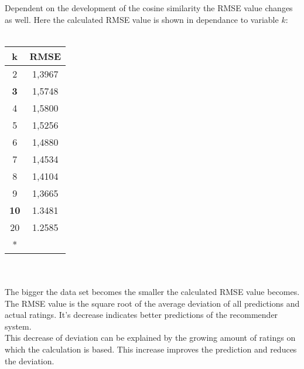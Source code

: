 \documentclass[a4paper,12pt,twoside]{article}
\begin{document}
Dependent on the development of the cosine similarity the RMSE value changes as well. Here the calculated RMSE value is shown in dependance to variable $k$:\\
\\
\begin{tabular}{c|c}
\textbf{k} & \textbf{RMSE} \\ \hline
	2 &  1,3967\\
	\textbf{3} & 1,5748 \\
	4 & 1,5800\\
	5 &  1,5256 \\
	6 &  1,4880\\
	7 & 1,4534\\
	8 &  1,4104  \\
	9 &  1,3665\\
	\textbf{10} & 1.3481 \\
	20 &  1.2585\\
	* & \\
\end{tabular} \\
\\
The bigger the data set becomes the smaller the calculated RMSE value becomes. The RMSE value is the square root of the average deviation of all predictions and actual ratings. It's decrease indicates better predictions of the recommender system.\\
This decrease of deviation can be explained by the growing amount of ratings on which the calculation is based. This increase improves the prediction and reduces the deviation.\\   
\end{document}
